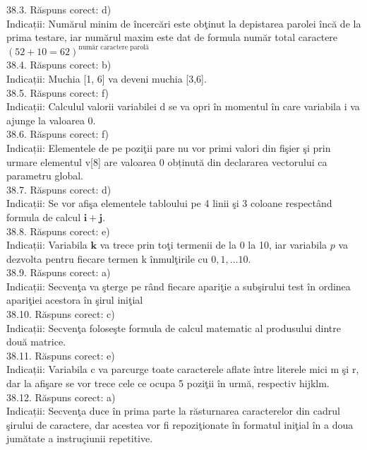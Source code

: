 38.3. Răspuns corect: d)\\
Indicații: Numărul minim de încercări este obţinut la depistarea parolei încă de la prima testare, iar numărul maxim este dat de formula număr total caractere
$(52+10=62)^{\text {număr caractere parolă }}$\\

38.4. Răspuns corect: b)\\
Indicații: Muchia [1, 6] va deveni muchia [3,6].\\

38.5. Răspuns corect: f)\\
Indicații: Calculul valorii variabilei d se va opri în momentul în care variabila i va ajunge la valoarea 0.\\

38.6. Răspuns corect: f)\\
Indicații: Elementele de pe poziţii pare nu vor primi valori din fişier şi prin urmare elementul v[8] are valoarea 0 obținută din declararea vectorului ca parametru global.\\

38.7. Răspuns corect: d)\\
Indicații: Se vor afişa elementele tabloului pe 4 linii şi 3 coloane respectând formula de calcul $\mathbf{i + j}$.\\

38.8. Răspuns corect: e)\\
Indicații: Variabila $\mathbf{k}$ va trece prin toţi termenii de la 0 la 10, iar variabila $p$ va dezvolta pentru fiecare termen k înmulţirile cu $0,1, \ldots 10$.\\

38.9. Răspuns corect: a)\\
Indicații: Secvenţa va şterge pe rând fiecare apariţie a subşirului test în ordinea apariţiei acestora în şirul iniţial\\

38.10. Răspuns corect: c)\\
Indicații: Secvenţa foloseşte formula de calcul matematic al produsului dintre două matrice.\\

38.11. Răspuns corect: e)\\
Indicații: Variabila c va parcurge toate caracterele aflate între literele mici m şi r, dar la afişare se vor trece cele ce ocupa 5 poziţii în urmă, respectiv hijklm.\\

38.12. Răspuns corect: a)\\
Indicații: Secvenţa duce în prima parte la răsturnarea caracterelor din cadrul şirului de caractere, dar acestea vor fi repoziţionate în formatul iniţial în a doua jumătate a instruçiunii repetitive.\\

